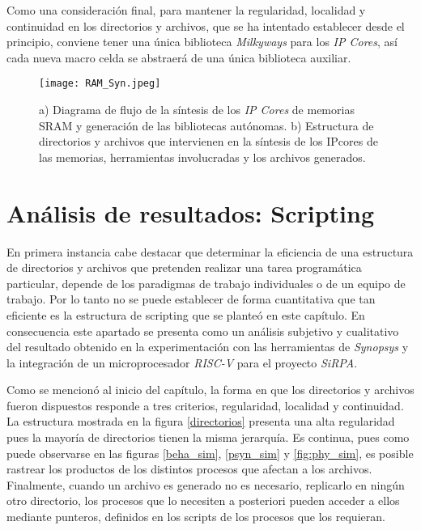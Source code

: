 Como una consideración final, para mantener la regularidad, localidad y continuidad en los directorios y archivos, que se ha intentado establecer desde el principio, conviene tener una única biblioteca \textit{Milkyways} para los \textit{IP Cores}, así cada nueva macro celda se abstraerá de una única biblioteca auxiliar.

\begin{figure}[ht]
\texttt{[image: RAM\_Syn.jpeg]}
\centering
\caption{a) Diagrama de flujo de la síntesis de los \textit{IP Cores} de memorias SRAM y generación de las bibliotecas autónomas. \newline b) Estructura de directorios y archivos que intervienen en la síntesis de los IPcores de las memorias, herramientas involucradas y los archivos generados.}
\end{figure}

\newpage

\section{Análisis de resultados: Scripting }

En primera instancia cabe destacar que determinar la eficiencia de una estructura de directorios y archivos que pretenden realizar una tarea programática particular, depende de los paradigmas de trabajo individuales o de un equipo de trabajo. Por lo tanto no se puede establecer de forma cuantitativa que tan eficiente es la estructura de scripting que se planteó en este capítulo. En consecuencia este apartado se presenta como un análisis subjetivo y cualitativo del resultado obtenido en la experimentación con las herramientas de \textit{Synopsys} y la integración de un microprocesador \textit{RISC-V} para el proyecto \textit{SiRPA}.

Como se mencionó al inicio del capítulo, la forma en que los directorios y archivos fueron dispuestos responde a tres criterios, regularidad, localidad y continuidad. La estructura mostrada en la figura \ref{directorios} presenta una alta regularidad pues la mayoría de directorios tienen la misma jerarquía. Es continua, pues como puede observarse en las figuras \ref{beha_sim}, \ref{psyn_sim} y \ref{fig:phy_sim}, es posible rastrear los productos de los distintos procesos que afectan a los archivos. Finalmente, cuando un archivo es generado no es necesario, replicarlo en ningún otro directorio, los procesos que lo necesiten a posteriori pueden acceder a ellos mediante punteros, definidos en los scripts de los procesos que los requieran.









